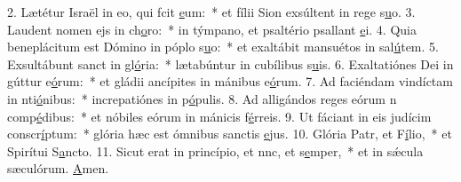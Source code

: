 2. Lætétur Israël in eo, qui fcit \uline{e}um:~* et fílii Sion exsúltent in rege s\uline{u}o.
3. Laudent nomen ejs in ch\uline{o}ro:~* in týmpano, et psaltério psallant \uline{e}i.
4. Quia beneplácitum est Dómino in póplo s\uline{u}o:~* et exaltábit mansuétos in sal\uline{ú}tem.
5. Exsultábunt sanct in gl\uline{ó}ria:~* lætabúntur in cubílibus s\uline{u}is.
6. Exaltatiónes Dei in gúttur e\uline{ó}rum:~* et gládii ancípites in mánibus e\uline{ó}rum.
7. Ad faciéndam vindíctam in nti\uline{ó}nibus:~* increpatiónes in p\uline{ó}pulis.
8. Ad alligándos reges eórum n comp\uline{é}dibus:~* et nóbiles eórum in mánicis f\uline{é}rreis.
9. Ut fáciant in eis judícim conscr\uline{í}ptum:~* glória hæc est ómnibus sanctis \uline{e}jus.
10. Glória Patr, et F\uline{í}lio,~* et Spirítui S\uline{a}ncto.
11. Sicut erat in princípio, et nnc, et s\uline{e}mper,~* et in sǽcula sæculórum. \uline{A}men.
